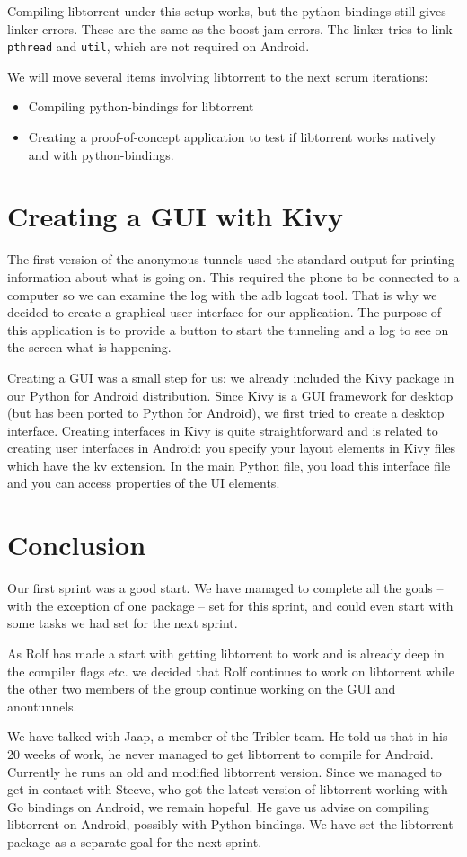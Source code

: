 		Compiling libtorrent under this setup works, but the python-bindings still gives linker errors. These are the same as the boost jam errors. The linker tries to link \texttt{pthread} and \texttt{util}, which are not required on Android.
		
		We will move several items involving libtorrent to the next scrum iterations:
		\begin{itemize}
		\item Compiling python-bindings for libtorrent
		\item Creating a proof-of-concept application to test if libtorrent works natively and with python-bindings.
		\end{itemize}
	
	\section{Creating a GUI with Kivy}
		The first version of the anonymous tunnels used the standard output for printing information about what is going on. This required the phone to be connected to a computer so we can examine the log with the adb logcat tool. That is why we decided to create a graphical user interface for our application. The purpose of this application is to provide a button to start the tunneling and a log to see on the screen what is happening.
	
		Creating a GUI was a small step for us: we already included the Kivy package in our Python for Android distribution. Since Kivy is a GUI framework for desktop (but has been ported to Python for Android), we first tried to create a desktop interface. Creating interfaces in Kivy is quite straightforward and is related to creating user interfaces in Android: you specify your layout elements in Kivy files which have the kv extension. In the main Python file, you load this interface file and you can access properties of the UI elements.
	
	\section{Conclusion}
		Our first sprint was a good start. We have managed to complete all the goals -- with the exception of one package -- set for this sprint, and could even start with some tasks we had set for the next sprint.
		
		As Rolf has made a start with getting libtorrent to work and is already deep in the compiler flags etc. we decided that Rolf continues to work on libtorrent while the other two members of the group continue working on the GUI and anontunnels.
		
		We have talked with Jaap, a member of the Tribler team. He told us that in his 20 weeks of work, he never managed to get libtorrent to compile for Android.
		Currently he runs an old and modified libtorrent version. Since we managed to get in contact with Steeve, who got the latest version of libtorrent working with Go bindings on Android, we remain hopeful. He gave us advise on compiling libtorrent on Android, possibly with Python bindings. We have set the libtorrent package as a separate goal for the next sprint.
